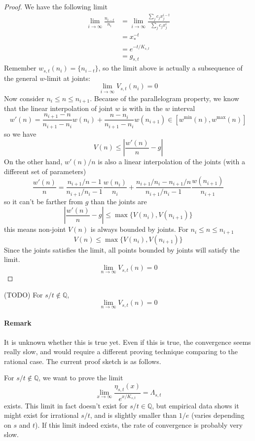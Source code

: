 \documentclass[]{article}
\begin{document}
\begin{proof}
	We have the following limit
	\begin{align*}
	\lim_{i\to\infty} \frac{n_{i-t}}{n_i} &= \lim_{i\to\infty} \frac{\sum_{j} c_j x^{i-t}_j}{\sum_{j} c_j x^i_j} \\
	&= x_*^{-t}\\
	&= e^{-t/K_{s,t}}\\
	&= g_{s,t}
	\end{align*}
	Remember $w_{s,t}(n_i) = \{n_{i-t}\}$, so the limit above is actually a subsequence of the general $w$-limit at joints:
	\[
	\lim_{i\to\infty} V_{s,t}(n_i) = 0
	\]
	Now consider $n_i\le n \le n_{i+1}$. Because of the parallelogram property, we know that the linear interpolation of joint $w$ is with in the $w$ interval 
	\[
		w'(n) = \frac{n_{i+1} - n}{n_{i+1} - n_{i}} w(n_i) + \frac{n - n_{i}}{n_{i+1} - n_{i}} w(n_{i+1}) \in [w^{\min}(n), w^{\max}(n)]
	\]
	so we have
	\[
	V(n) \le \left|\frac{w'(n)}{n} - g\right|
	\]
	On the other hand, $w'(n)/n$ is also a linear interpolation of the joints (with a different set of parameters)
	\[
	\frac{w'(n)}{n} = \frac{n_{i+1}/n-1}{n_{i+1}/n_i-1} \frac{w(n_i)}{n_i} + \frac{n_{i+1}/n_i - n_{i+1}/n}{n_{i+1}/n_i-1} \frac{w(n_{i+1})}{n_{i+1}}
	\]
	so it can't be farther from $g$ than the joints are
	\[
	\left|\frac{w'(n)}{n} - g\right| \le \max\{ V(n_i), V(n_{i+1}) \}
	\]
	this means non-joint $V(n)$ is always bounded by joints. For $n_i\le n \le n_{i+1}$
	\[
	V(n) \le \max\{ V(n_i), V(n_{i+1}) \}
	\]
	Since the joints satisfies the limit, all points bounded by joints will satisfy the limit.
	\[
	\lim_{n\to\infty} V_{s,t}(n) = 0
	\]
\end{proof}



\vspace{1cm}
\begin{lemma}(TODO)
	For $s/t\notin\mathbb{Q}$, 
	\[
	\lim_{n\to\infty} V_{s,t}(n) = 0
	\]
\end{lemma}
\paragraph{Remark}
It is unknown whether this is true yet. Even if this is true, the convergence seems really slow, and would require a different proving technique comparing to the rational case. The current proof sketch is as follows.

For $s/t\notin\mathbb{Q}$, we want to prove the limit
\[
	\lim_{x\to\infty} \frac{\eta_{s,t}(x)}{e^{x/K_{s,t}}} = \Lambda_{s,t}
\]
exists. This limit in fact doesn't exist for $s/t\in\mathbb{Q}$, but empirical data shows it might exist for irrational $s/t$, and is slightly smaller than $1/e$ (varies depending on $s$ and $t$). If this limit indeed exists, the rate of convergence is probably very slow.
\end{document}
